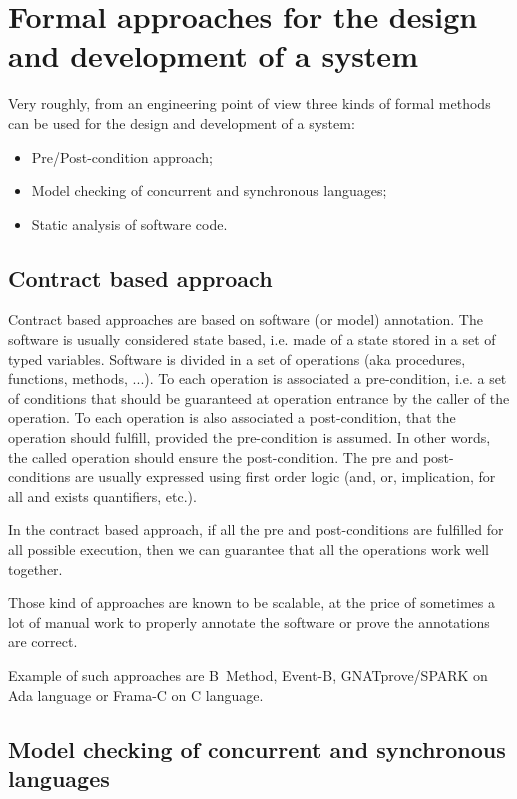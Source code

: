 \section{Formal approaches for the design and development of a system}

Very roughly, from an engineering point of view three kinds of formal
methods can be used for the design and development of a system:
\begin{itemize}
\item Pre/Post-condition approach;
\item Model checking of concurrent and synchronous languages;
\item Static analysis of software code.
\end{itemize}

\subsection{Contract based approach}

Contract based approaches are based on software (or model)
annotation. The software is usually considered state based, i.e. made
of a state stored in a set of typed variables.  Software is divided in
a set of operations (aka procedures, functions, methods, ...). To each
operation is associated a pre-condition, i.e. a set of conditions that
should be guaranteed at operation entrance by the caller of the
operation. To each operation is also associated a post-condition, that
the operation should fulfill, provided the pre-condition is
assumed. In other words, the called operation should ensure the
post-condition. The pre and post-conditions are usually expressed
using first order logic (and, or, implication, for all and exists
quantifiers, etc.).

In the contract based approach, if all the pre and post-conditions are
fulfilled for all possible execution, then we can guarantee that all
the operations work well together.

Those kind of approaches are known to be scalable, at the price of
sometimes a lot of manual work to properly annotate the software or
prove the annotations are correct.

Example of such approaches are B~Method, Event-B, GNATprove/SPARK on
Ada language or Frama-C on C language.

\subsection{Model checking of concurrent and synchronous languages}

